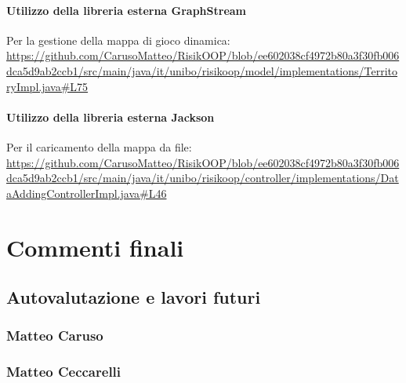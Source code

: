 \documentclass[a4paper,12pt]{report}
\begin{document}
\subsubsection{Utilizzo della libreria esterna GraphStream}
Per la gestione della mappa di gioco dinamica: \url{https://github.com/CarusoMatteo/RisikOOP/blob/ee602038cf4972b80a3f30fb006dca5d9ab2ccb1/src/main/java/it/unibo/risikoop/model/implementations/TerritoryImpl.java#L75}
\subsubsection{Utilizzo della libreria esterna Jackson}
Per il caricamento della mappa da file: \url{https://github.com/CarusoMatteo/RisikOOP/blob/ee602038cf4972b80a3f30fb006dca5d9ab2ccb1/src/main/java/it/unibo/risikoop/controller/implementations/DataAddingControllerImpl.java#L46}
\chapter{Commenti finali}

\section{Autovalutazione e lavori futuri}
\subsection{Matteo Caruso}
\subsection{Matteo Ceccarelli}
\end{document}
